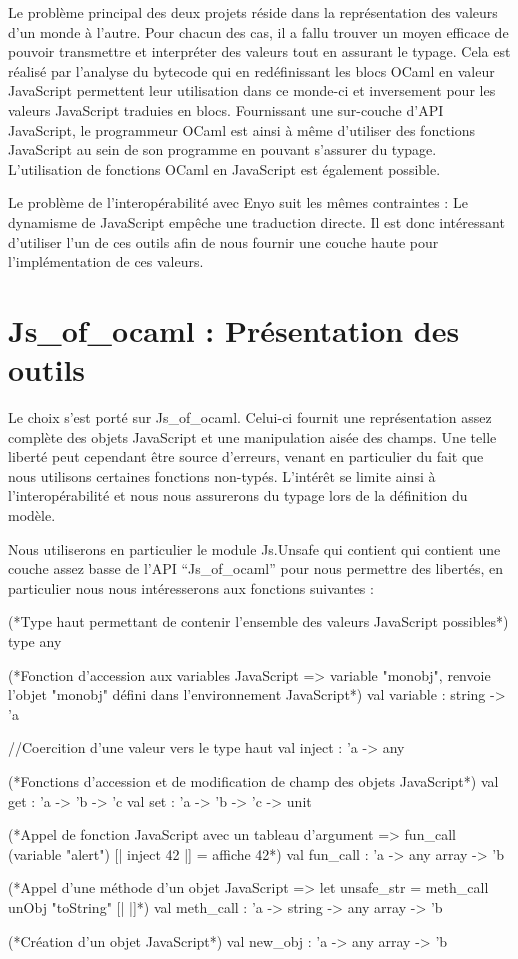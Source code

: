 \documentclass[11pt,a4paper]{report}
\begin{document}
Le problème principal des deux projets réside dans la représentation des valeurs
d'un monde à l'autre. Pour chacun des cas, il a fallu trouver un moyen efficace de
pouvoir transmettre et interpréter des valeurs tout en assurant le typage.
Cela est réalisé par l'analyse du bytecode qui en redéfinissant les blocs OCaml
en valeur JavaScript permettent leur utilisation dans ce monde-ci et inversement pour
les valeurs JavaScript traduies en blocs. Fournissant une sur-couche d'API JavaScript,
le programmeur OCaml est ainsi à même d'utiliser des fonctions JavaScript au sein de son
programme en pouvant s'assurer du typage. L'utilisation de fonctions OCaml en JavaScript
est également possible.

Le problème de l'interopérabilité avec Enyo suit les mêmes contraintes :
Le dynamisme de JavaScript empêche une traduction directe. Il est donc intéressant
d'utiliser l'un de ces outils afin de nous fournir une couche haute pour l'implémentation de
ces valeurs.


\section{Js\_of\_ocaml : Présentation des outils}

Le choix s'est porté sur Js\_of\_ocaml. Celui-ci fournit une représentation assez complète des
objets JavaScript et une manipulation aisée des champs. Une telle liberté peut cependant être source
d'erreurs, venant en particulier du fait que nous utilisons certaines fonctions non-typés.
L'intérêt se limite ainsi à l'interopérabilité et nous nous assurerons du typage lors de la définition
du modèle.

Nous utiliserons en particulier le module Js.Unsafe qui contient qui contient une couche assez basse
de l'API ``Js\_of\_ocaml'' pour nous permettre des libertés, en particulier nous 
nous intéresserons aux fonctions suivantes :

\begin{OCaml}
(*Type haut permettant de contenir l'ensemble des valeurs JavaScript possibles*)
type any

(*Fonction d'accession aux variables JavaScript
  => variable "monobj", renvoie l'objet "monobj" défini dans l'environnement JavaScript*)
val variable : string -> 'a

//Coercition d'une valeur vers le type haut
val inject : 'a -> any

(*Fonctions d'accession et de modification de champ des objets JavaScript*)
val get : 'a -> 'b -> 'c
val set : 'a -> 'b -> 'c -> unit

(*Appel de fonction JavaScript avec un tableau d'argument
  => fun_call (variable "alert") [| inject 42 |]
  = affiche 42*)
val fun_call : 'a -> any array -> 'b

(*Appel d'une méthode d'un objet JavaScript
  => let unsafe_str = meth_call unObj "toString" [| |]*)
val meth_call : 'a -> string -> any array -> 'b

(*Création d'un objet JavaScript*)
val new_obj : 'a -> any array -> 'b
\end{OCaml}
\end{document}
